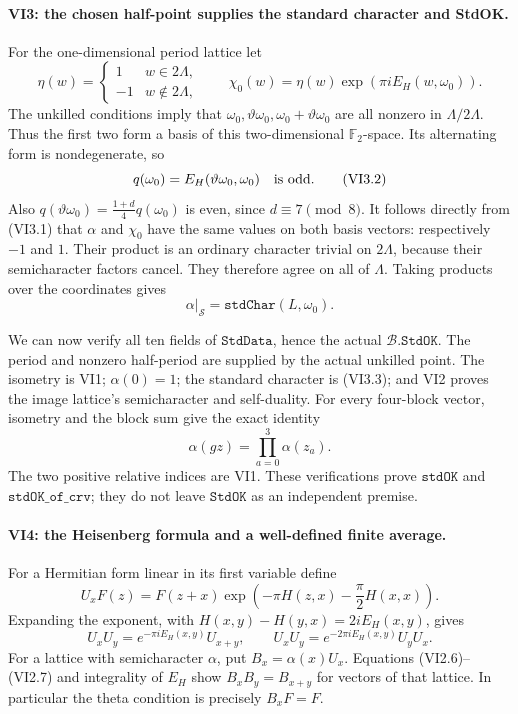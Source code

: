 \paragraph{VI3: the chosen half-point supplies the standard character and StdOK.}
For the one-dimensional period lattice let
\[
 \eta(w)=
 \begin{cases}1&w\in2\Lambda,\\-1&w\notin2\Lambda,\end{cases}
 \qquad
 \chi_0(w)=\eta(w)\exp(\pi iE_H(w,\omega_0)).
 \tag{VI3.1}
\]
The unkilled conditions imply that
\(\omega_0,\vartheta\omega_0,\omega_0+\vartheta\omega_0\)
are all nonzero in \(\Lambda/2\Lambda\). Thus the first two
form a basis of this two-dimensional \(\mathbb F_2\)-space.
Its alternating form is nondegenerate, so
\[
 q(\omega_0)=E_H(\vartheta\omega_0,\omega_0)
                         \quad\hbox{is odd}.
 \tag{VI3.2}
\]
Also \(q(\vartheta\omega_0)=
\frac{1+d}{4}q(\omega_0)\) is even, since \(d\equiv7\pmod8\).
It follows directly from (VI3.1) that \(\alpha\) and \(\chi_0\)
have the same values on both basis vectors: respectively \(-1\)
and \(1\). Their product is an ordinary character trivial on
\(2\Lambda\), because their semicharacter factors cancel.
They therefore agree on all of \(\Lambda\).
Taking products over the coordinates gives
\[
       \alpha|_{\mathcal S}=\texttt{stdChar}(L,\omega_0).
 \tag{VI3.3}
\]

We can now verify all ten fields of \(\texttt{StdData}\), hence
the actual \(\mathscr B.\texttt{StdOK}\).
The period and nonzero half-period are supplied by the actual
unkilled point. The isometry is VI1; \(\alpha(0)=1\);
the standard character is (VI3.3); and VI2 proves the image
lattice's semicharacter and self-duality. For every four-block
vector, isometry and the block sum give the exact identity
\[
             \alpha(gz)=\prod_{a=0}^3\alpha(z_a).
 \tag{VI3.4}
\]
The two positive relative indices are VI1. These verifications
prove \(\texttt{stdOK}\) and \(\texttt{stdOK\_of\_crv}\);
they do not leave \(\texttt{StdOK}\) as an independent premise.

\paragraph{VI4: the Heisenberg formula and a well-defined finite average.}
For a Hermitian form linear in its first variable define
\[
 U_xF(z)=F(z+x)
          \exp\!\left(-\pi H(z,x)-\frac{\pi}{2}H(x,x)\right).
 \tag{VI4.1}
\]
Expanding the exponent, with
\(H(x,y)-H(y,x)=2iE_H(x,y)\), gives
\[
 U_xU_y=e^{-\pi iE_H(x,y)}U_{x+y},\qquad
 U_xU_y=e^{-2\pi iE_H(x,y)}U_yU_x.
 \tag{VI4.2}
\]
For a lattice with semicharacter \(\alpha\), put
\(B_x=\alpha(x)U_x\). Equations (VI2.6)--(VI2.7) and integrality
of \(E_H\) show \(B_xB_y=B_{x+y}\) for vectors of that lattice.
In particular the theta condition is precisely \(B_xF=F\).

